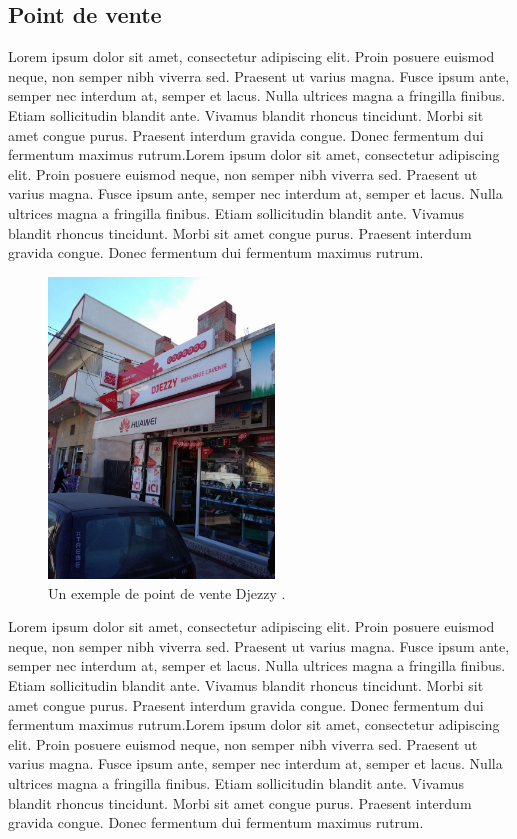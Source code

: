 \medskip

\subsection{Point de vente}
\label{sec:pos}

Lorem ipsum dolor sit amet, consectetur adipiscing elit. Proin posuere euismod neque, non semper nibh viverra sed. Praesent ut varius magna. Fusce ipsum ante, semper nec interdum at, semper et lacus. Nulla ultrices magna a fringilla finibus. Etiam sollicitudin blandit ante. Vivamus blandit rhoncus tincidunt. Morbi sit amet congue purus. Praesent interdum gravida congue. Donec fermentum dui fermentum maximus rutrum.Lorem ipsum dolor sit amet, consectetur adipiscing elit. Proin posuere euismod neque, non semper nibh viverra sed. Praesent ut varius magna. Fusce ipsum ante, semper nec interdum at, semper et lacus. Nulla ultrices magna a fringilla finibus. Etiam sollicitudin blandit ante. Vivamus blandit rhoncus tincidunt. Morbi sit amet congue purus. Praesent interdum gravida congue. Donec fermentum dui fermentum maximus rutrum.

\medskip


\begin{figure}[hbt!]
  \centering
  \includegraphics[height=8cm]{images_pfe/point-de-vente.jpg}
  \caption{Un exemple de point de vente Djezzy \parencite{web_image_point_de_vente_2019}.}
  \label{fig:point-de-vente}
\end{figure}
\FloatBarrier

Lorem ipsum dolor sit amet, consectetur adipiscing elit. Proin posuere euismod neque, non semper nibh viverra sed. Praesent ut varius magna. Fusce ipsum ante, semper nec interdum at, semper et lacus. Nulla ultrices magna a fringilla finibus. Etiam sollicitudin blandit ante. Vivamus blandit rhoncus tincidunt. Morbi sit amet congue purus. Praesent interdum gravida congue. Donec fermentum dui fermentum maximus rutrum.Lorem ipsum dolor sit amet, consectetur adipiscing elit. Proin posuere euismod neque, non semper nibh viverra sed. Praesent ut varius magna. Fusce ipsum ante, semper nec interdum at, semper et lacus. Nulla ultrices magna a fringilla finibus. Etiam sollicitudin blandit ante. Vivamus blandit rhoncus tincidunt. Morbi sit amet congue purus. Praesent interdum gravida congue. Donec fermentum dui fermentum maximus rutrum.



